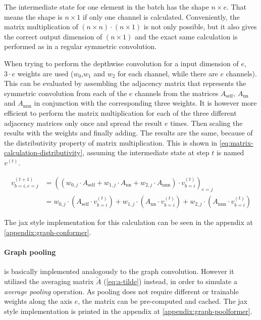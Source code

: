The intermediate state for one element in the batch has the shape $n \times e$. 
That means the shape is $n \times 1$ if only one channel is calculated.
Conveniently, the matrix multiplication of $(n\times n) \cdot (n\times 1)$ is not only possible, but it also gives the correct output dimension of $(n\times 1)$ and the exact same calculation is performed as in a regular symmetric convolution.

When trying to perform the depthwise convolution for a input dimension of $e$, $3 \cdot e$ weights are used ($w_0$,$w_1$ and $w_2$ for each channel, while there are $e$ channels).
This can be evaluated by assembling the adjacency matrix that represents the symmetric convolution from each of the $e$ channels from the matrices $A_\mathrm{self}$, $A_\mathrm{nn}$ and $A_\mathrm{nnn}$ in conjunction with the corresponding three weights.
It is however more efficient to perform the matrix multiplication for each of the three different adjacency matrices only once and spread the result $e$ times. 
Then scaling the results with the weights and finally adding.
The results are the same, because of the distributivity property of matrix multiplication.
This is shown in \autoref{eq:matrix-calculation-distributivity}, assuming the intermediate state at step $t$ is named $v^{(t)}$.

\begin{equation}
    \label{eq:matrix-calculation-distributivity}
    \begin{split}
        v^{(t+1)}_{b=i, e=j} &= \left(\left(w_{0, j} \cdot A_\mathrm{self} + w_{1, j} \cdot A_\mathrm{nn} + w_{2, j} \cdot A_\mathrm{nnn}\right) \cdot v^{(t)}_{b=i}\right)_{e=j}\\
        &= w_{0, j} \cdot \left(A_\mathrm{self}\cdot v^{(t)}_{b=i}\right) + w_{1, j} \cdot \left(A_\mathrm{nn}\cdot v^{(t)}_{b=i}\right) + w_{2, j} \cdot \left(A_\mathrm{nnn}\cdot v^{(t)}_{b=i}\right)
    \end{split}
\end{equation}

The jax style implementation for this calculation can be seen in the appendix at \ref{appendix:graph-conformer}.

\paragraph{Graph pooling} is basically implemented analogously to the graph convolution.
However it utilized the averaging matrix $\tilde{A}$ (\autoref{eq:a-tilde}) instead, in order to simulate a \emph{average pooling} operation.
As pooling does not require different or trainable weights along the axis $e$, the matrix can be pre-computed and cached.
The jax style implementation is printed in the appendix at \ref{appendix:graph-poolformer}.


